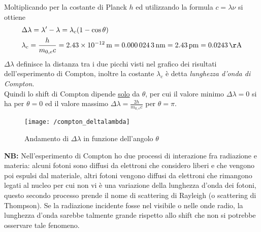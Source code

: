 Moltiplicando per la costante di Planck $h$ ed utilizzando la formula $c = \lambda \nu$ si ottiene
\begin{equation}
\begin{split}
& \Delta \lambda = \lambda' - \lambda = \lambda_c (1 - \cos \theta) \\
& \lambda_c = \frac{ h}{m_{0,e} c } = \SI{2.43e-12}{m} = \SI{0.0000243}{nm} = \SI{2.43}{pm} = \SI{0.0243}{\AA}
\end{split}
\end{equation}
$\Delta \lambda$ definisce la distanza tra i due picchi visti nel grafico dei risultati dell'esperimento di Compton, inoltre la costante $\lambda_c$ è detta \textit{lunghezza d'onda di Compton}. \\
Quindi lo shift di Compton dipende \underline{solo} da $\theta$, per cui il valore minimo $\Delta \lambda = 0$ si ha per $\theta = 0$ ed il valore massimo $\Delta \lambda = \frac{ 2 h }{m_{0,e} c }$ per $\theta = \pi$.

\begin{figure}[h]
\centering
\texttt{[image: /compton\_deltalambda]}
\caption{Andamento di $\Delta\lambda$ in funzione dell'angolo $\theta$}
\end{figure}

\textbf{NB:} Nell'esperimento di Compton ho due processi di interazione fra radiazione e materia: alcuni fotoni sono diffusi da elettroni che considero liberi e che vengono poi espulsi dal materiale, altri fotoni vengono diffusi da elettroni che rimangono legati al nucleo per cui non vi è una variazione della lunghezza d'onda dei fotoni, questo secondo processo prende il nome di scattering di Rayleigh (o scattering di Thompson).
Se la radiazione incidente fosse nel visibile o nelle onde radio, la lunghezza d'onda sarebbe talmente grande rispetto allo shift che non si potrebbe osservare tale fenomeno.

